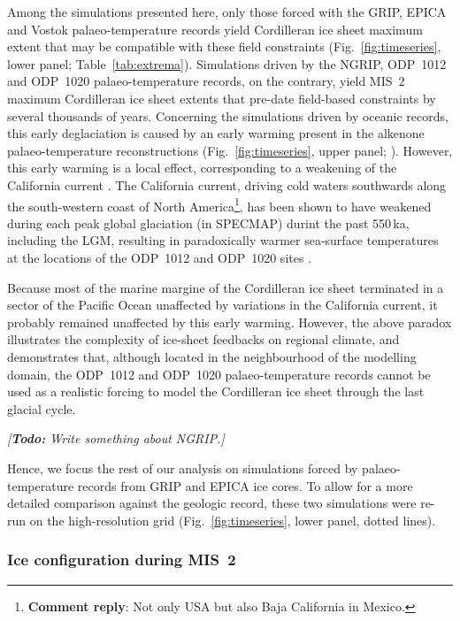 \documentclass[tc, manuscript]{copernicus}
\newcommand{\renote}[1]{\footnote{\textbf{Comment reply}: #1}}
\newcommand{\todo}[1]{\emph{[\textbf{Todo:} #1]}}
\begin{document}
Among the simulations presented here, only those forced with the GRIP, EPICA
and Vostok palaeo-temperature records yield Cordilleran ice sheet maximum
extent that may be compatible with these field constraints
(Fig.~\ref{fig:timeseries}, lower panel; Table~\ref{tab:extrema}).
Simulations driven by the NGRIP, ODP~1012 and ODP~1020
palaeo-temperature records, on the contrary, yield MIS~2 maximum Cordilleran
ice sheet extents that pre-date field-based constraints by several thousands of
years. Concerning the simulations driven by oceanic records, this early
deglaciation is caused by an early warming present in the alkenone
palaeo-temperature reconstructions (Fig.~\ref{fig:timeseries}, upper panel;
\citealp[Fig.~3]{Herbert.etal.2001}). However, this
early warming is a local effect, corresponding to a weakening of the California
current \citep{Herbert.etal.2001}. The California current, driving cold
waters southwards along the south-western coast of North America\renote{
    Not only USA but also Baja California in Mexico.},
has been shown to have weakened during each peak global glaciation (in SPECMAP)
durint the past 550\,ka, including the LGM, resulting in paradoxically warmer
sea-surface temperatures at the locations of the ODP~1012 and ODP~1020 sites
\citep{Herbert.etal.2001}.

Because most of the marine margine of the Cordilleran ice sheet terminated in a
sector of the Pacific Ocean unaffected by variations in the California current,
it probably remained unaffected by this early warming. However, the above paradox
illustrates the complexity of ice-sheet feedbacks on regional climate, and
demonstrates that, although located in the neighbourhood of the modelling
domain, the ODP~1012 and ODP~1020 palaeo-temperature records cannot be
used as a realistic forcing to model the Cordilleran ice sheet
through the last glacial cycle.

\todo{Write something about NGRIP.}

Hence, we focus the rest of our analysis on simulations forced by
palaeo-temperature records from GRIP and EPICA ice cores. To allow for a more
detailed comparison against the geologic record, these two simulations were
re-run on the high-resolution grid (Fig.~\ref{fig:timeseries}, lower panel,
dotted lines).


\subsubsection{Ice configuration during MIS~2}
\label{sec:mis2}
\end{document}
